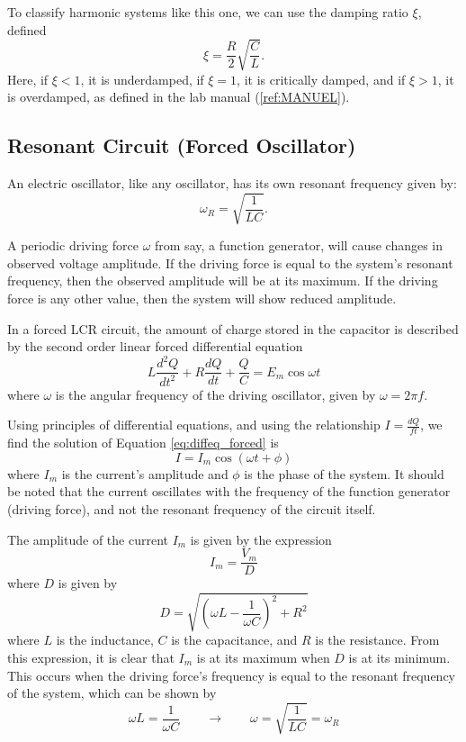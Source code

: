 \documentclass[12pt]{article}
\newcommand{\paren}[1]{\left( {#1} \right)}
\begin{document}
To classify harmonic systems like this one, we can use the damping ratio $\xi$, defined
\begin{equation}
	\xi=\frac{R}{2}\sqrt{\frac{C}{L}}.\label{eq:xi_non_app}
\end{equation}
Here, if $\xi<1$, it is underdamped, if $\xi=1$, it is critically damped, and if $\xi>1$, it is overdamped, as defined in the lab manual (\ref{ref:MANUEL}).

\subsection{Resonant Circuit (Forced Oscillator)}
An electric oscillator, like any oscillator, has its own resonant frequency given by:
\begin{equation}
	\omega_R=\sqrt{\frac{1}{LC}}. \label{eq:omega_R_base}
\end{equation}

A periodic driving force $\omega$ from say, a function generator, will cause changes in observed voltage amplitude. If the driving force is equal to the system's resonant frequency, then the observed amplitude will be at its maximum. If the driving force is any other value, then the system will show reduced amplitude.

In a forced LCR circuit, the amount of charge stored in the capacitor is described by the second order linear forced differential equation
\begin{equation}
	L\frac{d^2Q}{dt^2}+R\frac{dQ}{dt}+\frac{Q}{C}=E_m\cos\omega t \label{eq:diffeq_forced}
\end{equation}
where $\omega$ is the angular frequency of the driving oscillator, given by $\omega=2\pi f$.

Using principles of differential equations, and using the relationship $I=\frac{dQ}{ft}$, we find the solution of Equation \ref{eq:diffeq_forced} is
\begin{equation}
	I=I_m\cos\paren{\omega t + \phi} \label{eq:diffeq_forced_solved}
\end{equation}
where $I_m$ is the current's amplitude and $\phi$ is the phase of the system. It should be noted that the current oscillates with the frequency of the function generator (driving force), and not the resonant frequency of the circuit itself.

The amplitude of the current $I_m$ is given by the expression
\begin{equation}
	I_m=\frac{V_m}{D} \label{eq:current_amp}
\end{equation}
where $D$ is given by
\begin{equation}
	D=\sqrt{\paren{\omega L-\frac{1}{\omega C}}^2+R^2} \label{eq:D}
\end{equation}
where $L$ is the inductance, $C$ is the capacitance, and $R$ is the resistance. From this expression, it is clear that $I_m$ is at its maximum when $D$ is at its minimum. This occurs when the driving force's frequency is equal to the resonant frequency of the system, which can be shown by
\begin{equation}
	\omega L = \frac{1}{\omega C} \qquad \rightarrow \qquad \omega=\sqrt{\frac{1}{LC}}=\omega_R \label{eq:maximum_current_amp}
\end{equation}
\end{document}
